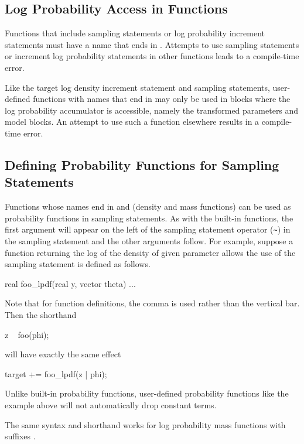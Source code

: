 \subsection{Log Probability Access in Functions}

Functions that include sampling statements or log probability
increment statements must have a name that ends in .
Attempts to use sampling statements or increment log probability
statements in other functions leads to a compile-time error.

Like the target log density increment statement and sampling
statements, user-defined functions with names that end in 
may only be used in blocks where the log probability accumulator is
accessible, namely the transformed parameters and model blocks.  An
attempt to use such a function elsewhere results in a compile-time
error.

\subsection{Defining Probability Functions for Sampling Statements}

Functions whose names end in  and  (density
and mass functions) can be used as probability functions in sampling
statements.  As with the built-in functions, the first argument will
appear on the left of the sampling statement operator (\Verb|~|) in
the sampling statement and the other arguments follow.  For example,
suppose a function returning the log of the density of  given
parameter  allows the use of the sampling statement is
defined as follows.
%
\begin{stancode}
real foo_lpdf(real y, vector theta) { ... }
\end{stancode}
%
Note that for function definitions, the comma is used rather than the
vertical bar.  Then the shorthand
%
\begin{stancode}
z ~ foo(phi);
\end{stancode}
%
will have exactly the same effect
%
\begin{stancode}
target += foo_lpdf(z | phi);
\end{stancode}
%
Unlike built-in probability functions, user-defined
probability functions like the example  above will not
automatically drop constant terms.

The same syntax and shorthand works for log probability mass functions
with suffixes .

